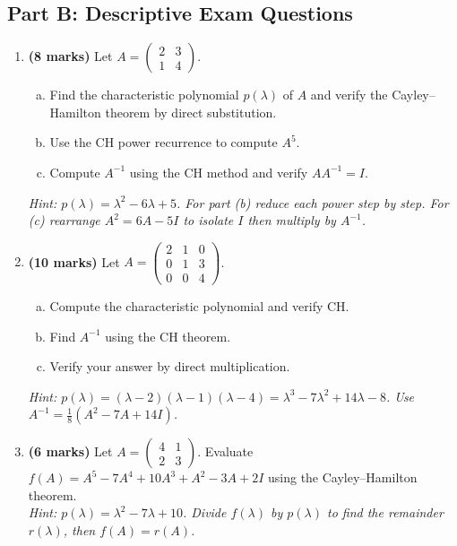 \documentclass[12pt,a4paper]{article}
\begin{document}
\subsection*{Part B: Descriptive Exam Questions}

\begin{enumerate}
  \item \textbf{(8 marks)} Let \(A = \begin{pmatrix}2 & 3 \\ 1 & 4\end{pmatrix}\).
    \begin{enumerate}[(a)]
      \item Find the characteristic polynomial \(p(\lambda)\) of \(A\) and verify the Cayley--Hamilton theorem by direct substitution.
      \item Use the CH power recurrence to compute \(A^5\).
      \item Compute \(A^{-1}\) using the CH method and verify \(AA^{-1} = I\).
    \end{enumerate}
    \textit{Hint: \(p(\lambda) = \lambda^2 - 6\lambda + 5\). For part (b) reduce each power step by step. For (c) rearrange \(A^2 = 6A - 5I\) to isolate \(I\) then multiply by \(A^{-1}\).}

  \item \textbf{(10 marks)} Let \(A = \begin{pmatrix}2&1&0\\0&1&3\\0&0&4\end{pmatrix}\).
    \begin{enumerate}[(a)]
      \item Compute the characteristic polynomial and verify CH.
      \item Find \(A^{-1}\) using the CH theorem.
      \item Verify your answer by direct multiplication.
    \end{enumerate}
    \textit{Hint: \(p(\lambda) = (\lambda-2)(\lambda-1)(\lambda-4) = \lambda^3 - 7\lambda^2 + 14\lambda - 8\). Use \(A^{-1} = \tfrac{1}{8}(A^2 - 7A + 14I)\).}

  \item \textbf{(6 marks)} Let \(A = \begin{pmatrix}4 & 1 \\ 2 & 3\end{pmatrix}\). Evaluate \(f(A) = A^5 - 7A^4 + 10A^3 + A^2 - 3A + 2I\) using the Cayley--Hamilton theorem.\\
    \textit{Hint: \(p(\lambda) = \lambda^2 - 7\lambda + 10\). Divide \(f(\lambda)\) by \(p(\lambda)\) to find the remainder \(r(\lambda)\), then \(f(A) = r(A)\).}


\end{enumerate}
\end{document}
